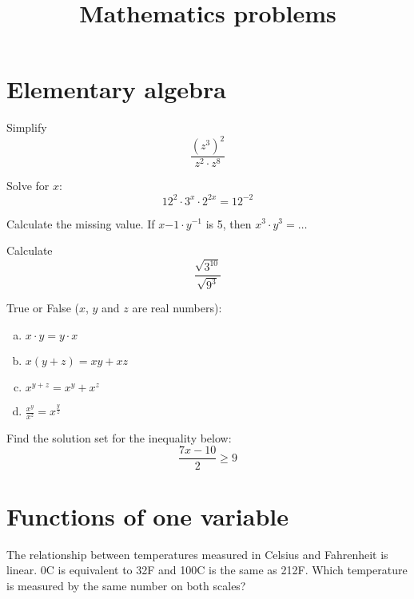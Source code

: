 \documentclass[10pt]{article}
\newenvironment{problem}[2][Problem]{\begin{trivlist}
\item[\hskip \labelsep {\bfseries #1}\hskip \labelsep {\bfseries #2.}]}{\end{trivlist}}
\begin{document}
 
\title{Mathematics problems}
\date{}
\maketitle

 \section{Elementary algebra}
 
\begin{problem}{1.1}
Simplify $$\frac{(z^{3})^2}{z^2 \cdot z^8}$$
\end{problem}

\begin{problem}{1.2}
Solve for $x$:
$$12^2 \cdot 3^x \cdot 2^{2x} = 12^{-2}$$
\end{problem}

\begin{problem}{1.3}
Calculate the missing value. If $x{-1} \cdot y^{-1}$ is 5, then $x^{3} \cdot y^{3}=\dots$
\end{problem}

\begin{problem}{1.4}
Calculate
$$\frac{\sqrt{3^{10}}}{\sqrt{9^3}}$$
\end{problem}

\begin{problem}{1.5}
True or False ($x$, $y$ and $z$ are real numbers):
\begin{enumerate}[(a)]
    \item $x \cdot y=y \cdot x$
    \item $x(y+z)=xy+xz$
    \item $x^{y+z}=x^y+x^z$
    \item $\frac{x^y}{x^z}=x^{\frac{y}{z}}$
\end{enumerate}
\end{problem}

\begin{problem}{1.6}
Find the solution set for the inequality below:
$$\frac{7x-10}{2}\ge9$$
\end{problem}

\section{Functions of one variable}

\begin{problem}{2.1 (Based on SYD 2.5.6)}
The relationship between temperatures measured in Celsius and Fahrenheit is linear. 0\degree C is equivalent to 32\degree F and 100\degree C is the same as 212\degree F.
 Which temperature is measured by the same number on both scales?
\end{problem}
\end{document}
